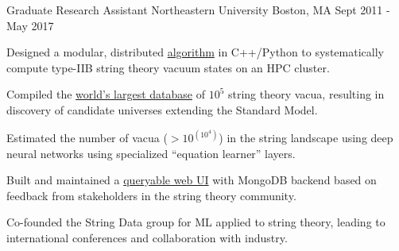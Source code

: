 \begin{cventries}
  \cventry
    {Graduate Research Assistant} %
    {Northeastern University} %
    {Boston, MA} %
    {Sept 2011 - May 2017} %
    {
      \begin{cvitems} %
        \item {Designed a modular, distributed \href{http://github.com/knowbodynos/stringmods}{algorithm} in C++/Python to systematically compute type-IIB string theory vacuum states on an HPC cluster.}
        \item {Compiled the \href{https://app.box.com/s/ch4w5gy1wv9dv11ptf314u7ovj2x4vig}{world's largest database} of $10^5$ string theory vacua, resulting in discovery of candidate universes extending the Standard Model.} %
        \item {Estimated the number of vacua ($>10^{(10^{4})}$) in the string landscape using deep neural networks using specialized ``equation learner'' layers.}
        \item {Built and maintained a \href{http://www.rossealtman.com/toriccy/}{queryable web UI} with MongoDB backend based on feedback from stakeholders in the string theory community.}
        \item {Co-founded the String Data group for ML applied to string theory, leading to international conferences and collaboration with industry.}
      \end{cvitems}
    }


\end{cventries}
